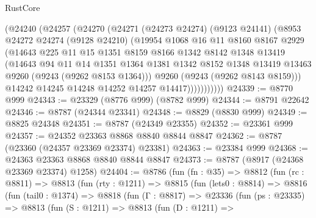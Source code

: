 \begin{lexlean}{RustCore}
\begin{coremodule}
              (@24240
                (@24257
                  (@24270
                    (@24271
                      (@24273 @24274)
                      (@9123 @24141)
                      (@8953
                        @24272
                        @24274
                        (@9128 @24210)
                        (@19954
                          @1068
                          @16
                          @11
                          @8160
                          @8167
                          @2929
                          (@14643
                            @225
                            @11
                            @15
                            @1351
                            @8159
                            @8166
                            @1342
                            @8142
                            @1348
                            @13419
                            (@14643
                              @94
                              @11
                              @14
                              @1351
                              @1364
                              @1381
                              @1342
                              @8152
                              @1348
                              @13419
                              @13463
                              @9260
                              (@9243 (@9262 @8153 @1364)))
                            @9260
                            (@9243 (@9262 @8143 @8159)))
                          @14242
                          @14245
                          @14248
                          @14252
                          @14257
                          @14417)))))))))))
@24339 := @8770 @999
@24343 := @23329 (@8776 @999) (@8782 @999)
@24344 := @8791 @22642
@24346 := @8787 (@24344 @23341)
@24348 := @8829 (@8830 @999)
@24349 := @8825 @24348
@24351 := @8787 (@24349 @23355)
@24352 := @23361 @999
@24357 := @24352 @23363 @8868 @8840 @8844 @8847
@24362 := @8787 (@23360 (@24357 @23369 @23374) @23381)
@24363 := @23384 @999
@24368 := @24363 @23363 @8868 @8840 @8844 @8847
@24373 := @8787 (@8917 (@24368 @23369 @23374) @1258)
@24404 := @8786
    (fun (fn : @35) =>
    @8812
      (fun (rc : @8811) =>
      @8813
        (fun (rty : @1211) =>
        @8815
          (fun (lets0 : @8814) =>
          @8816
            (fun (tail0 : @1374) =>
            @8818
              (fun (Γ : @8817) =>
              @23336
                (fun (ps : @23335) =>
                @8813
                  (fun (S : @1211) =>
                  @8813
                    (fun (D : @1211) =>

\end{coremodule}
\end{lexlean}
